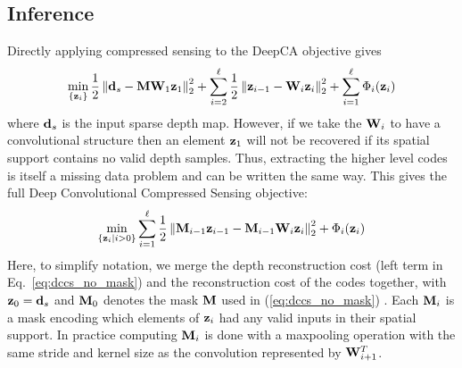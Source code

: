 
\subsection{Inference}
\label{sec:deep-compr-sens}

Directly applying compressed sensing to the DeepCA objective gives
\begin{equation}
  \min_{\{\mathbf{z}_i\}} \frac{1}{2} \left\Vert \mathbf{d}_s - \mathbf{M}\mathbf{W}_1\mathbf{z}_1 \right\Vert_2^2  +  \sum_{i=2}^{\ell} \frac{1}{2} \left\Vert \mathbf{z}_{i-1} - \mathbf{W}_i\mathbf{z}_i\right\Vert_2^2 + \sum_{i=1}^{\ell}\Phi_i(\mathbf{z}_i) 
  \label{eq:dccs_no_mask}
\end{equation}
where $\mathbf{d}_s$ is the input sparse depth map. However, if we take the $\mathbf{W}_i$ to have a convolutional structure then an element $\mathbf{z}_1$ will not be recovered if its spatial support contains no valid depth samples. Thus, extracting the higher level codes is itself a missing data problem and can be written the same way. This gives the full Deep Convolutional Compressed Sensing objective:
\begin{equation}
  \label{eq:dccs}
  \min_{\{\mathbf{z}_i \vert i>0\}} \sum_{i=1}^{\ell} \frac{1}{2} \left\Vert \mathbf{M}_{i-1}\mathbf{z}_{i-1} - \mathbf{M}_{i-1}\mathbf{W}_i\mathbf{z}_i\right\Vert_2^2 + \Phi_i(\mathbf{z}_i)
\end{equation}
Here, to simplify notation, we merge the depth reconstruction cost (left term in Eq.~\ref{eq:dccs_no_mask}) and the reconstruction cost of the codes together, with $\mathbf{z}_0 = \mathbf{d}_s$ and $\mathbf{M}_0$ denotes the mask $\mathbf{M}$ used in (\ref{eq:dccs_no_mask}) . Each $\mathbf{M}_i$ is a mask encoding which elements of $\mathbf{z}_i$ had any valid inputs in their spatial support. In practice computing $\mathbf{M}_i$ is done with a maxpooling operation with the same stride and kernel size as the convolution represented by $\mathbf{W}_{i+1}^T$.\\

